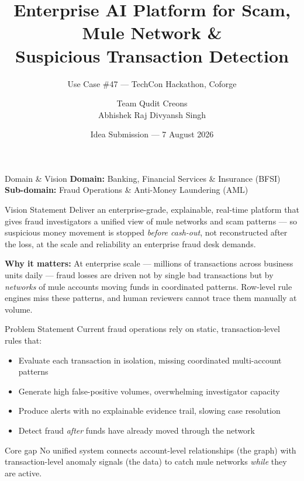 \documentclass[aspectratio=169]{beamer}
\title[Enterprise Mule Network Detection]{Enterprise AI Platform for Scam, Mule Network \& \\ Suspicious Transaction Detection}
\subtitle{Use Case \#47 --- TechCon Hackathon, Coforge}
\author{Team Qudit Creons \\[0.3em] \small Abhishek Raj \quad \textbar\quad Divyansh Singh}
\institute{Coforge --- \#CoforgeTechCon2026 \quad \#CoforgeHackathon}
\date{Idea Submission --- 7 August 2026}
\begin{document}
\begin{frame}
\titlepage
\end{frame}

\begin{frame}{Domain \& Vision}
\textbf{Domain:} Banking, Financial Services \& Insurance (BFSI) \\
\textbf{Sub-domain:} Fraud Operations \& Anti-Money Laundering (AML)

\vspace{1em}
\begin{block}{Vision Statement}
Deliver an enterprise-grade, explainable, real-time platform that gives fraud investigators a unified view of mule networks and scam patterns --- so suspicious money movement is stopped \emph{before cash-out}, not reconstructed after the loss, at the scale and reliability an enterprise fraud desk demands.
\end{block}

\vspace{1em}
\textbf{Why it matters:} At enterprise scale --- millions of transactions across business units daily --- fraud losses are driven not by single bad transactions but by \emph{networks} of mule accounts moving funds in coordinated patterns. Row-level rule engines miss these patterns, and human reviewers cannot trace them manually at volume.
\end{frame}

\begin{frame}{Problem Statement}
Current fraud operations rely on static, transaction-level rules that:
\begin{itemize}
\item Evaluate each transaction in isolation, missing coordinated multi-account patterns
\item Generate high false-positive volumes, overwhelming investigator capacity
\item Produce alerts with no explainable evidence trail, slowing case resolution
\item Detect fraud \emph{after} funds have already moved through the network
\end{itemize}

\vspace{0.5em}
\begin{block}{Core gap}
No unified system connects account-level relationships (the graph) with transaction-level anomaly signals (the data) to catch mule networks \emph{while} they are active.
\end{block}
\end{frame}
\end{document}
